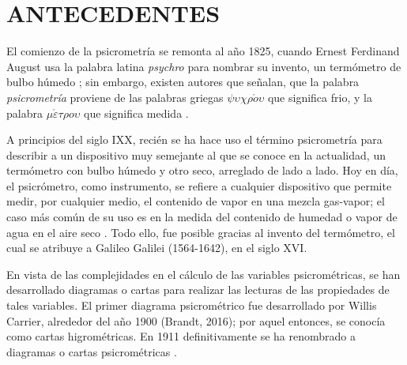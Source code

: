 \section{ANTECEDENTES}
    \label{cap1:sec:antecedente}
    El comienzo de la psicrometría se remonta al año 1825, cuando Ernest Ferdinand August usa la palabra latina \textit{psychro} para nombrar su invento, un termómetro de bulbo húmedo \parencite[ p. 9]{bib:Gatley2013}; sin embargo, existen autores que señalan, que la palabra \textit{psicrometría} proviene de las palabras griegas $\psi \upsilon \chi \rho \acute{o} \upsilon $ que significa frio, y la palabra $\mu \acute{\varepsilon} \tau  \rho o \upsilon$ que significa medida \parencite{bib:Shallcross1997}. 


    A principios del siglo IXX, recién se ha hace uso el término psicrometría para describir a un dispositivo muy semejante al que se conoce en la actualidad, un termómetro con bulbo húmedo y otro seco, arreglado de lado a lado. Hoy en día, el psicrómetro, como instrumento, se refiere a cualquier dispositivo que permite medir, por cualquier medio, el contenido de vapor en una mezcla gas-vapor; el caso más común de su uso es en la medida del contenido de humedad o vapor de agua en el aire seco \parencite{bib:Shallcross1997}. Todo ello, fue posible gracias al invento del termómetro, el cual se atribuye a Galileo Galilei (1564-1642), en el siglo XVI.

    En vista de las complejidades en el cálculo de las variables psicrométricas, se han desarrollado diagramas o cartas para realizar las lecturas de las propiedades de tales variables. 
    El primer diagrama psicrométrico fue desarrollado por Willis Carrier, alrededor del año 1900 (Brandt, 2016); por aquel entonces, se  conocía como cartas higrométricas. En 1911 definitivamente se ha renombrado a diagramas o cartas psicrométricas \parencite[ p. 10]{bib:Gatley2013}.%

